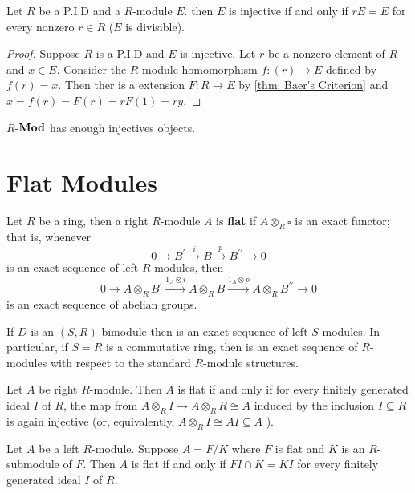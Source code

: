 \documentclass[12pt, oneside]{book}
\begin{document}
\begin{proposition}
    Let $R$ be a P.I.D and a $R$-module $E$. then $E$ is injective if and only if $r E=E$ for every nonzero $r \in R$ ($E$ is divisible).
    \begin{proof}
        Suppose $R$ is a P.I.D and $E$ is injective.
        Let $r$ be a nonzero element of $R$ and $x \in E$.
        Consider the $R$-module homomorphism $f: \left(r\right) \rightarrow E$ defined by $f(r)=x$.
        Then ther is a extension $F:R\rightarrow E$ by \cref{thm: Baer's Criterion} and $x=f(r)=F(r)=rF(1)=ry$.
    \end{proof}
\end{proposition}



\begin{proposition}
    $R$-$\mathbf{Mod}$ has enough injectives objects.
\end{proposition}


\section{Flat Modules} %

\begin{definition}
    Let $R$ be a ring, then a right $R$-module $A$ is \textbf{flat} if $A \otimes_R \square$ is an exact functor; that is, whenever
    \begin{equation*}
        0 \rightarrow B^{\prime} \xrightarrow{i} B \xrightarrow{p} B^{\prime \prime} \rightarrow 0
    \end{equation*}
    is an exact sequence of left $R$-modules, then
    \begin{equation*}
        0 \rightarrow A \otimes_R B^{\prime} \xrightarrow{1_A \otimes i} A \otimes_R B \xrightarrow{1_A \otimes p} A \otimes_R B^{\prime \prime} \rightarrow 0
    \end{equation*}
    is an exact sequence of abelian groups.
    \begin{remark}
        If $D$ is an $\left(S, R\right)$-bimodule then is an exact sequence of left $S$-modules.
        In particular, if $S=R$ is a commutative ring, then is an exact sequence of $R$-modules with respect to the standard $R$-module structures.
    \end{remark}
\end{definition}

\begin{theorem}
    Let $A$ be right $R$-module.
    Then $A$ is flat if and only if for every finitely generated ideal $I$ of $R$, the map from $A \otimes_R I \rightarrow A \otimes_R R \cong A$ induced by the inclusion $I \subseteq R$ is again injective (or, equivalently, $A \otimes_R I \cong A I \subseteq A$ ).


\end{theorem}
\begin{corollary}
    Let $A$ be a left $R$-module.
    Suppose $A=F / K$ where $F$ is flat and $K$ is an $R$-submodule of $F$.
    Then $A$ is flat if and only if $F I \cap K=K I$ for every finitely generated ideal $I$ of $R$.
\end{corollary}
\end{document}
